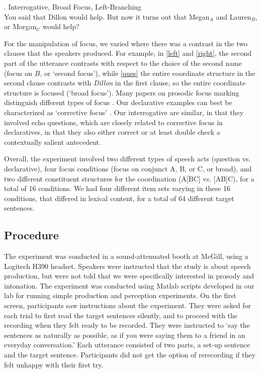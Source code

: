 \documentclass[preprint,review,12pt,authoryear,times]{elsarticle}
\begin{document}
 \ex. Interrogative, Broad Focus, Left-Branching\\
 {\footnotesize You said that Dillon would help. But now it turns out that Megan$_A$ and Lauren$_B$, or Morgan$_C$ would help?}\label{ques}
 
For the manipulation of focus, we varied where there was a contrast in the two clauses that the speakers produced.  For example, in \ref{left} and \ref{right}, the second part of the utterance contrasts with respect to the choice of the second name (focus on $B$, or `second focus'), while \ref{ques} the entire coordinate structure in the second clause contrasts with {\em Dillon} in the first clause, so the entire coordinate structure is focused (`broad focus'). Many papers on prosodic focus marking distinguish different types of focus \citep[e.g.][]{gusse07}. Our declarative examples can best be characterized as `corrective focus' \citep[cf.][]{ladd08, vanderkloketal18}. Our interrogative are similar, in that they involved echo questions, which are closely related to corrective focus in declaratives, in that they also either correct or at least double check a contextually salient antecedent.

Overall, the experiment involved two different types of speech acts (question vs. declarative), four focus conditions (focus on conjunct A, B, or C, or  broad), and two different constituent structures for the coordination (A[BC] vs. [AB]C), for a total of 16 conditions. We had four different item sets varying in these 16 conditions, that differed in lexical content, for a total of 64 different target sentences.


\subsection{Procedure}
The experiment was conducted in a sound-attenuated booth at McGill, using a Logitech H390 headset. Speakers were instructed that the study is about speech production, but were not told that we were specifically interested in prosody and intonation. The experiment was conducted using Matlab scripts developed in our lab for running simple production and perception experiments. On the first screen, participants saw instructions about the experiment. They were asked for each trial to  first read the target sentences silently, and to proceed with the recording when they felt ready to be recorded.  They were instructed to `say the sentences as naturally as possible, as if you were saying them to a friend in an everyday conversation.' Each utterance consisted of two parts, a set-up sentence and the target sentence. Participants did not get the option of rerecording if they felt unhappy with their first try.
\end{document}
